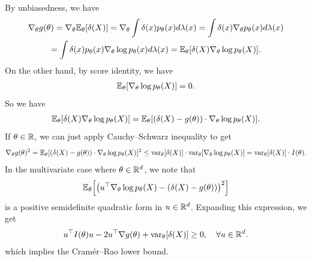 \documentclass[11pt,letterpaper]{article}
\numberwithin{theorem}{lecture}
\numberwithin{proposition}{lecture}
\numberwithin{lemma}{lecture}
\numberwithin{claim}{lecture}
\numberwithin{corollary}{lecture}
\numberwithin{definition}{lecture}
\numberwithin{conjecture}{lecture}
\numberwithin{remark}{lecture}
\numberwithin{example}{lecture}
\numberwithin{equation}{lecture}
\begin{document}
By unbiasedness, we have
\begin{multline*}
  \nabla_\theta g(\theta) = \nabla_\theta {\mathbb{E}}_\theta [\delta (X)] = \nabla_\theta \int \delta (x) p_\theta (x) d\lambda(x) = \int \delta (x) \nabla_\theta p_\theta (x) d\lambda(x)\\
   = \int \delta (x) p_\theta (x) \nabla_\theta \log p_\theta (x) d\lambda(x) = {\mathbb{E}}_\theta [\delta (X) \nabla_\theta \log p_\theta (X)].
\end{multline*}
On the other hand, by score identity, we have
\begin{align*}
  {\mathbb{E}}_\theta [\nabla_\theta \log p_\theta (X)] = 0.
\end{align*}
So we have
\begin{align*}
   {\mathbb{E}}_\theta [\delta (X) \nabla_\theta \log p_\theta (X)] = {\mathbb{E}}_\theta [(\delta (X) - g (\theta)) \cdot \nabla_\theta \log p_\theta (X)].
\end{align*}
If $\theta \in \mathbb{R}$, we can just apply Cauchy--Schwarz inequality to get
\begin{align*}
  \nabla_\theta g(\theta)^2 = {\mathbb{E}}_\theta [(\delta (X) - g (\theta)) \cdot \nabla_\theta \log p_\theta (X)]^2 \leq \operatorname{var}_\theta [\delta (X)] \cdot \operatorname{var}_\theta [\nabla_\theta \log p_\theta (X)] = \operatorname{var}_\theta [\delta (X)] \cdot I(\theta).
\end{align*}
In the multivariate case where $\theta \in \mathbb{R}^d$, we note that
\begin{align*}
  {\mathbb{E}}_\theta\Big[ \big( u^\top \nabla_\theta \log p_\theta (X) - (\delta (X) - g (\theta)) \big)^2 \Big]
\end{align*}
is a positive semidefinite quadratic form in $u \in \mathbb{R}^d$. Expanding this expression, we get
\begin{align*}
  u^\top I(\theta) u - 2 u^\top \nabla g (\theta) + \operatorname{var}_\theta [\delta (X)] \geq 0, \quad \forall u \in \mathbb{R}^d.
\end{align*}
which implies the Cram\'{e}r--Rao lower bound.

\bigskip
\end{document}
